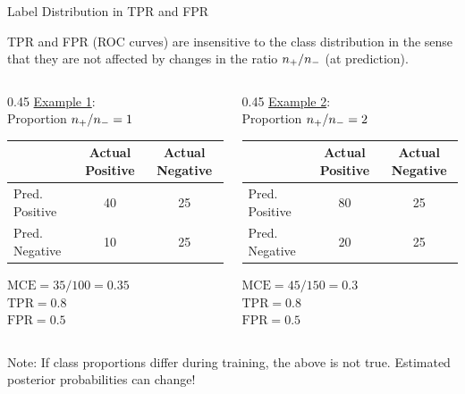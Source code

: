 \documentclass[11pt,compress,t,notes=noshow, xcolor=table]{beamer}
\begin{document}

\begin{vbframe}{Label Distribution in TPR and FPR}

TPR and FPR (ROC curves) are insensitive to the class distribution in the sense 
that they are not affected by changes in the ratio $n_{+}/n_{-}$ (at prediction).

\lz

\begin{columns}
  \begin{column}{0.45\textwidth}
  \underline{Example 1}:\\
  Proportion $n_{+}/n_{-} = 1$\\
  \lz
  {
  \tiny
  \centering
  \tiny
  \begin{tabular}{|l|c|c|}
                  \hline
                 & Actual Positive & Actual Negative \\ \hline
  Pred. Positive & 40            & 25            \\ \hline
  Pred. Negative & 10            & 25           \\ \hline
  \end{tabular}
  }
  
  \medskip
  $\text{MCE} = 35/100 = 0.35$\\
  $\text{TPR} = 0.8$\\ 
  $\text{FPR} = 0.5$ 
\end{column}
\begin{column}{0.45\textwidth} 
  \underline{Example 2}:\\
  Proportion $n_{+}/n_{-} = 2$\\
  \lz
  {
  \tiny
  \begin{tabular}{|l|c|c|}
                  \hline
                 & Actual Positive & Actual Negative \\ \hline
  Pred. Positive & 80            & 25            \\ \hline
  Pred. Negative & 20            & 25           \\ \hline
  \end{tabular}
  }
  
  \medskip
  $\text{MCE} = 45/150 = 0.3$\\
  $\text{TPR} = 0.8$\\ 
  $\text{FPR} = 0.5$ 
\end{column}
\end{columns}

\lz

Note: If class proportions differ during training, the above is not true. 
Estimated posterior probabilities can change!

\end{vbframe}
\end{document}
